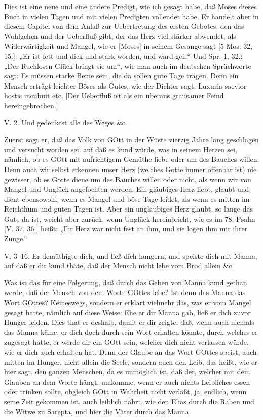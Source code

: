 Dies ist eine neue und eine andere Predigt, wie ich gesagt habe, daß Moses dieses Buch in vielen Tagen und mit vielen Predigten vollendet habe. Er handelt aber in diesem Capitel von dem Anlaß zur Uebertretung des ersten Gebotes, den das Wohlgehen und der Ueberfluß gibt, der das Herz viel stärker abwendet, als Widerwärtigkeit und Mangel, wie er [Moses] in seinem Gesange sagt [5 Mos. 32, 15.]: „Er ist fett und dick und stark worden, und ward geil.“ Und Spr. 1, 32.: „Der Ruchlosen Glück bringt sie um“, wie man auch im deutschen Sprüchworte sagt: Es müssen starke Beine sein, die da sollen gute Tage tragen. Denn ein Mensch erträgt leichter Böses als Gutes, wie der Dichter sagt: Luxuria saevior hostis incubuit etc. [Der Ueberfluß ist als ein überaus grausamer Feind hereingebrochen.]

\begin{schriftzitat}
V. 2. Und gedenkest alle des Weges \&c.
\end{schriftzitat}

Zuerst sagt er, daß das Volk von GOtt in der Wüste vierzig Jahre lang geschlagen und versucht worden sei, auf daß es kund würde, was in seinem Herzen sei, nämlich, ob es GOtt mit aufrichtigem Gemüthe liebe oder um des Bauches willen. Denn auch wir selbst erkennen unser Herz (welches Gotte immer offenbar ist) nie gewisser, ob es Gotte diene um des Bauches willen oder nicht, als wenn wir von Mangel und Unglück angefochten werden. Ein gläubiges Herz liebt, glaubt und dient ebensowohl, wenn es Mangel und böse Tage leidet, als wenn es mitten im Reichthum und guten Tagen ist. Aber ein ungläubiges Herz glaubt, so lange das Gute da ist, weicht aber zurück, wenn Unglück hereinbricht, wie es im 78. Psalm [V. 37. 36.] heißt: „Ihr Herz war nicht fest an ihm, und sie logen ihm mit ihrer Zunge.“

\begin{schriftzitat}
V. 3–16. Er demüthigte dich, und ließ dich hungern, und speiste dich mit Manna, auf daß er dir kund thäte, daß der Mensch nicht lebe vom Brod allein \&c.
\end{schriftzitat}

Was ist das für eine Folgerung, daß durch das Geben von Manna kund gethan werde, daß der Mensch von dem Worte GOttes lebe? Ist denn das Manna das Wort GOttes? Keineswegs, sondern er erklärt vielmehr das, was er vom Mangel gesagt hatte, nämlich auf diese Weise: Ehe er dir Manna gab, ließ er dich zuvor Hunger leiden. Dies that er deshalb, damit er dir zeigte, daß, wenn auch niemals das Manna käme, er dich doch durch sein Wort erhalten könnte, durch welches er zugesagt hatte, er werde dir ein GOtt sein, welcher dich nicht verlassen würde, wie er dich auch erhalten hat. Denn der Glaube an das Wort GOttes speist, auch mitten im Hunger, nicht allein die Seele, sondern auch den Leib, das heißt, wie er hier sagt, den ganzen Menschen, da es unmöglich ist, daß der, welcher mit dem Glauben an dem Worte hängt, umkomme, wenn er auch nichts Leibliches essen oder trinken sollte, obgleich GOtt
in Wahrheit nicht verläßt, ja, endlich, wenn seine Zeit gekommen ist, auch leiblich nährt, wie den Elias durch die Raben und die Witwe zu Sarepta, und hier die Väter durch das Manna.


